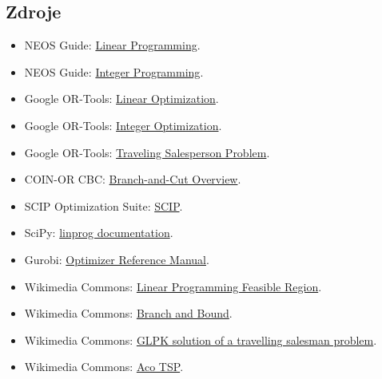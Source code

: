 \subsection{Zdroje}
\begin{itemize}
    \item NEOS Guide:
    \href{https://neos-guide.org/guide/types/lp/}{Linear Programming}.
    \item NEOS Guide:
    \href{https://neos-guide.org/guide/types/integer/}{Integer Programming}.
    \item Google OR-Tools:
    \href{https://developers.google.com/optimization/lp}{Linear Optimization}.
    \item Google OR-Tools:
    \href{https://developers.google.com/optimization/mip}{Integer Optimization}.
    \item Google OR-Tools:
    \href{https://developers.google.com/optimization/routing/tsp}{Traveling Salesperson Problem}.
    \item COIN-OR CBC:
    \href{https://www.coin-or.org/Cbc/ch01.html}{Branch-and-Cut Overview}.
    \item SCIP Optimization Suite:
    \href{https://scipopt.org/}{SCIP}.
    \item SciPy:
    \href{https://docs.scipy.org/doc/scipy/reference/generated/scipy.optimize.linprog.html}{linprog documentation}.
    \item Gurobi:
    \href{https://docs.gurobi.com/projects/optimizer/en/current/index.html}{Optimizer Reference Manual}.
    \item Wikimedia Commons:
    \href{https://commons.wikimedia.org/wiki/File:Linear\_Programming\_Feasible\_Region.svg}{Linear Programming Feasible Region}.
    \item Wikimedia Commons:
    \href{https://commons.wikimedia.org/wiki/File:Branch\_and\_Bound.png}{Branch and Bound}.
    \item Wikimedia Commons:
    \href{https://commons.wikimedia.org/wiki/File:GLPK\_solution\_of\_a\_travelling\_salesman\_problem.svg}{GLPK solution of a travelling salesman problem}.
    \item Wikimedia Commons:
    \href{https://commons.wikimedia.org/wiki/File:Aco\_TSP.svg}{Aco TSP}.
\end{itemize}
